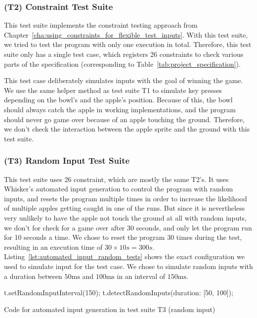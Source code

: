 \subsubsection{(T2) Constraint Test Suite}

This test suite implements the constraint testing approach from Chapter~\ref{cha:using_constraints_for_flexible_test_inputs}.
With this test suite, we tried to test the program with only one execution in total.
Therefore, this test suite only has a single test case, which registers 26 constraints to check various parts of the specification
(corresponding to Table~\ref{tab:project_specification}).
\parspace

This test case deliberately simulates inputs with the goal of winning the game.
We use the same helper method as test suite T1 to simulate key presses depending on the bowl's and the apple's position.
Because of this, the bowl should always catch the apple in working implementations,
and the program should never go game over because of an apple touching the ground.
Therefore, we don't check the interaction between the apple sprite and the ground with this test suite.

\subsubsection{(T3) Random Input Test Suite}

This test suite uses 26 constraint, which are mostly the same T2's.
It uses Whisker's automated input generation to control the program with random inputs,
and resets the program multiple times in order to increase the likelihood of multiple apples getting caught in one of the runs.
But since it is nevertheless very unlikely to have the apple not touch the ground at all with random inputs,
we don't for check for a game over after 30 seconds, and only let the program run for 10 seconds a time.
We chose to reset the program 30 times during the test, resulting in an execution time of $30 \times 10s = 300s$.
Listing~\ref{lst:automated_input_random_tests} shows the exact configuration we used to simulate input for the test case.
We chose to simulate random inputs with a duration between $50\text{ms}$ and $100\text{ms}$ in an interval of $150\text{ms}$.
\parspace

\begin{listing}[htpb]
    \centering
    \begin{minipage}{.55\textwidth}
        \begin{javascriptcode}
            t.setRandomInputInterval(150);
            t.detectRandomInputs({duration: [50, 100]});
        \end{javascriptcode}
    \end{minipage}
    \caption{Code for automated input generation in test suite T3 (random input)}
    \label{lst:automated_input_random_tests}
\end{listing}

